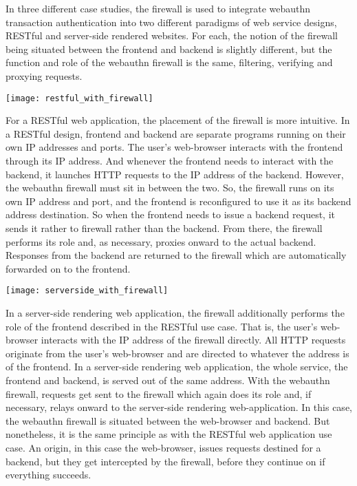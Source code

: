 In three different case studies, the firewall is used to integrate webauthn transaction authentication into two different paradigms of web service designs, RESTful and server-side rendered websites. For each, the notion of the firewall being situated between the frontend and backend is slightly different, but the function and role of the webauthn firewall is the same, filtering, verifying and proxying requests. 

\begin{center}
\texttt{[image: restful\_with\_firewall]}
\end{center}

For a RESTful web application, the placement of the firewall is more intuitive. In a RESTful design, frontend and backend are separate programs running on their own IP addresses and ports. The user's web-browser interacts with the frontend through its IP address. And whenever the frontend needs to interact with the backend, it launches HTTP requests to the IP address of the backend. However, the webauthn firewall must sit in between the two. So, the firewall runs on its own IP address and port, and the frontend is reconfigured to use it as its backend address destination. So when the frontend needs to issue a backend request, it sends it rather to firewall rather than the backend. From there, the firewall performs its role and, as necessary, proxies onward to the actual backend. Responses from the backend are returned to the firewall which are automatically forwarded on to the frontend. 

\begin{center}
\texttt{[image: serverside\_with\_firewall]}
\end{center}

In a server-side rendering web application, the firewall additionally performs the role of the frontend described in the RESTful use case. That is, the user's web-browser interacts with the IP address of the firewall directly. All HTTP requests originate from the user's web-browser and are directed to whatever the address is of the frontend. In a server-side rendering web application, the whole service, the frontend and backend, is served out of the same address. With the webauthn firewall, requests get sent to the firewall which again does its role and, if necessary, relays onward to the server-side rendering web-application. In this case, the webauthn firewall is situated between the web-browser and backend. But nonetheless, it is the same principle as with the RESTful web application use case. An origin, in this case the web-browser, issues requests destined for a backend, but they get intercepted by the firewall, before they continue on if everything succeeds.

